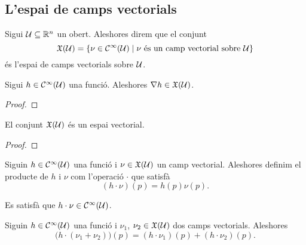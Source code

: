 \documentclass[../Apunts.tex]{subfiles}
\begin{document}
	\subsection{L'espai de camps vectorials}
	\begin{definition}
		\label{def:conjunt de camps vectorials}
		Sigui \(\mathcal{U}\subseteq\mathbb{R}^{n}\) un obert. Aleshores direm que el conjunt
		\[\mathfrak{X}(\mathcal{U})=\{\nu\in\mathcal{C}^{\infty}(\mathcal{U})\mid\nu\text{ és un camp vectorial sobre }\mathcal{U}\}\]
		és l'espai de camps vectorials sobre \(\mathcal{U}\).
	\end{definition}
	\begin{example}
		\label{ex:els gradients de les funcions C infinit són camps vectorials}
		Sigui \(h\in\mathcal{C}^{\infty}(\mathcal{U})\) una funció. Aleshores \(\nabla h\in\mathfrak{X}(\mathcal{U})\).
	\end{example}
	\begin{proof}
	\end{proof}
	\begin{proposition}
		\label{prop:l'espai de camps vectorials és un espai vectorial}
		El conjunt \(\mathfrak{X}(\mathcal{U})\) és un espai vectorial.
	\end{proposition}
	\begin{proof}
	\end{proof}
	\begin{definition}
		\label{def:producte d'una funció i un camp vectorial}
		Siguin \(h\in\mathcal{C}^{\infty}(\mathcal{U})\) una funció i \(\nu\in\mathfrak{X}(\mathcal{U})\) un camp vectorial. Aleshores definim el producte de \(h\) i \(\nu\) com l'operació \(\cdot\) que satisfà
		\[(h\cdot\nu)(p)=h(p)\nu(p).\]
	\end{definition}
	\begin{observation}
		\label{obs:el producte d'una funció i un camp vectorial és C-infinit}
		Es satisfà que \(h\cdot\nu\in\mathcal{C}^{\infty}(\mathcal{U})\).
	\end{observation}
	\begin{proposition}
		\label{prop:el producte d'una funcio i un camp vectorial és distributiu per la suma de camps vectorials}
		Siguin \(h\in\mathcal{C}^{\infty}(\mathcal{U})\) una funció i \(\nu_{1}\), \(\nu_{2}\in\mathfrak{X}(\mathcal{U})\) dos camps vectorials. Aleshores
		\[\big(h\cdot(\nu_{1}+\nu_{2})\big)(p)=(h\cdot\nu_{1})(p)+(h\cdot\nu_{2})(p).\]
	\end{proposition}
\end{document}
